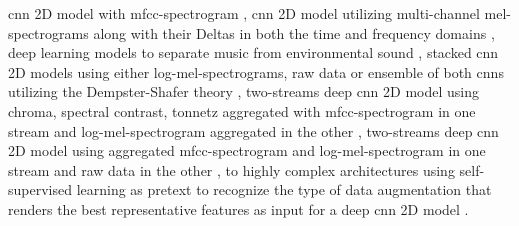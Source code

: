 \gls{cnn} 2D model with \gls{mfcc}-spectrogram \cite{Shreyas2020}, \gls{cnn} 2D model utilizing multi-channel mel-spectrograms along with their Deltas in both the time and frequency domains \cite{Tang2018}, deep learning models to separate music from environmental sound \cite{Rothmund2018}, stacked \gls{cnn} 2D models using either log-mel-spectrograms, raw data or ensemble of both \gls{cnn}s utilizing the Dempster-Shafer theory \cite{Li2018}, two-streams deep \gls{cnn} 2D model using chroma, spectral contrast, tonnetz aggregated with \gls{mfcc}-spectrogram in one stream and log-mel-spectrogram aggregated in the other \cite{Su2019}, two-streams deep \gls{cnn} 2D model using aggregated \gls{mfcc}-spectrogram and log-mel-spectrogram in one stream and raw data in the other \cite{Tran2020}, to highly complex architectures using self-supervised learning as pretext to recognize the type of data augmentation that renders the best representative features as input for a deep \gls{cnn} 2D model \cite{Tripathi2021}.


